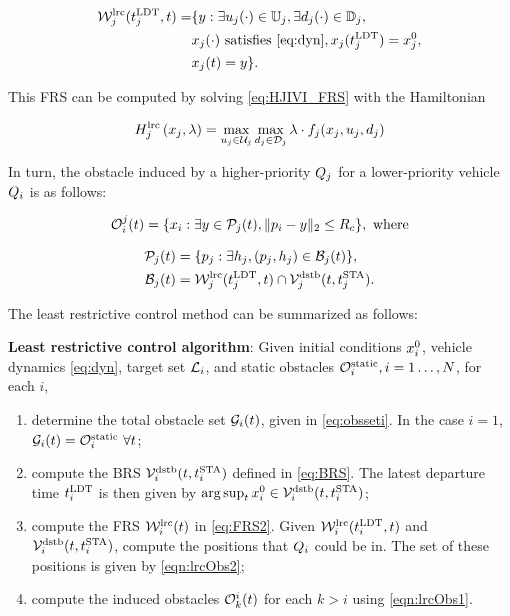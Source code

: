 \begin{equation}
\label{eq:FRS2}
\begin{aligned}
\frs_j^\text{lrc}(\ldt_j, t) = & \{y: \exists \ctrl_j(\cdot)\in\cfset_j, \exists \dstb_j(\cdot) \in \dfset_j, \\
& \state_j(\cdot) \text{ satisfies \eqref{eq:dyn}}, \state_j(\ldt_j) = \state_{j}^0,\\
& \state_j(t) = y\}.
\end{aligned}
\end{equation}

This FRS can be computed by solving \eqref{eq:HJIVI_FRS} with the Hamiltonian

\begin{equation}
H_j^\text{lrc}\left(x_j, \lambda\right) = \max_{u_j \in \mathcal{U}_j} \max_{d_j \in \mathcal{D}_j} \lambda \cdot f_j(x_j, u_j, d_j)
\end{equation}

In turn, the obstacle induced by a higher-priority $Q_j$ for a lower-priority vehicle $Q_i$ is as follows:

\begin{equation}
\label{eqn:lrcObs1}
\ioset_i^j(t) = \{\state_i: \exists y \in \pfrs_j(t), \|\pos_i - y\|_2 \le \rc \}, \text{ where}
\end{equation}

\begin{align}
\pfrs_j(t) & = \{p_j: \exists \npos_j, (p_j, \npos_j) \in \boset_j(t) \}, \label{eqn:lrcObs2}\\
\boset_j(t) & = \frs_j^\text{lrc}(\ldt_j, t) \cap \brs_j^\text{dstb}(t, \sta_j). \label{eqn:lrcObs3}
\end{align}

The least restrictive control method can be summarized as follows:
\begin{alg}
\label{alg:lrc}
\textbf{Least restrictive control algorithm}: Given initial conditions $x_i^0$, vehicle dynamics \eqref{eq:dyn}, target set $\mathcal{L}_i$, and static obstacles $\mathcal{O}^\text{static}_i, i = 1\ldots, N$, for each $i$,
\begin{enumerate}
\item determine the total obstacle set $\mathcal{G}_i(t)$, given in \eqref{eq:obsseti}. In the case $i=1$, $\mathcal{G}_i(t) = \mathcal{O}^\text{static}_i ~ \forall t$;
\item compute the BRS $\mathcal{V}_i^\text{dstb}(t, t^\text{STA}_i)$ defined in \eqref{eq:BRS}. The latest departure time $t^\text{LDT}_i$ is then given by $\arg \sup_t x_{i}^0 \in \mathcal{V}_i^\text{dstb}(t, t^\text{STA}_i)$;
\item compute the FRS $\mathcal{W}_i^\text{lrc}(t)$ in \eqref{eq:FRS2}. Given $\mathcal{W}_i^\text{lrc}(t^\text{LDT}_i, t)$ and $\mathcal{V}_i^\text{dstb}(t, t^\text{STA}_i)$, compute the positions that $Q_i$ could be in. The set of these positions is given by \eqref{eqn:lrcObs2};
\item compute the induced obstacles $\mathcal{O}_k^i(t)$ for each $k>i$ using \eqref{eqn:lrcObs1}.
\end{enumerate}
\end{alg}


